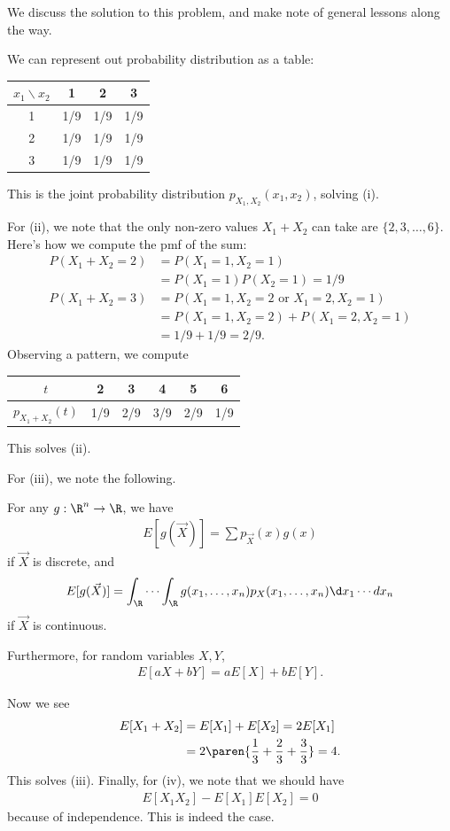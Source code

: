 \documentclass[11pt]{article}
\begin{document}
We discuss the solution to this problem, and make note of general lessons along the way.

We can represent out probability distribution as a table:
\begin{table}[H]
    \centering
    \begin{tabular}{c|ccc}
        $x_1\backslash x_2$ & 1 & 2 & 3 \\ \hline
        1 & 1/9 & 1/9 & 1/9 \\
        2 & 1/9 & 1/9 & 1/9\\
        3 & 1/9 & 1/9 & 1/9
    \end{tabular}
\end{table}
This is the joint probability distribution $p_{X_1,X_2}(x_1,x_2)$, solving (i).

For (ii), we note that the only non-zero values $X_1+X_2$ can take are $\{2,3,\dots,6\}$. Here's how we compute the pmf of the sum:
\begin{align*}
P(X_1+X_2=2) &=P(X_1=1,X_2=1) \\
&= P(X_1=1)P(X_2=1)=1/9 \\
P(X_1+X_2=3) &= P(X_1=1,X_2=2 \text{ or } X_1=2,X_2=1) \\
&= P(X_1=1,X_2=2) + P(X_1=2,X_2=1) \\
&= 1/9 + 1/9 = 2/9.
\end{align*}
Observing a pattern, we compute
\begin{table}[H]
    \centering
    \begin{tabular}{c|ccccc}
        $t$ & 2&3&4&5&6 \\ \hline
        $p_{X_1+X_2}(t)$ & 1/9 & 2/9 & 3/9 & 2/9 & 1/9
    \end{tabular}
\end{table}
This solves (ii).

For (iii), we note the following.
\begin{prop}
For any $g:\R^n \to \R$, we have
\begin{align*}
E[g(\vec X)]=\sum p_{\vec X}(x)g(x)
\end{align*}
if $\vec X$ is discrete, and
\begin{align*}
E[g(\vec X)] = \int_\R \cdots \int_\R g(x_1,\dots,x_n)p_X(x_1,\dots,x_n)\d x_1\cdots dx_n
\end{align*}
if $\vec X$ is continuous.

Furthermore, for random variables $X, Y$,
\begin{align*}
E[a X + b Y]=aE[X]+bE[Y].
\end{align*}
\end{prop}
Now we see
\begin{align*}
E[X_1+X_2]&=E[X_1]+E[X_2]=2E[X_1] \\
&= 2\paren{\frac{1}{3}+\frac{2}{3}+\frac{3}{3}}=4.
\end{align*}
This solves (iii). Finally, for (iv), we note that we should have
\begin{align*}
E[X_1X_2]-E[X_1]E[X_2]=0
\end{align*}
because of independence. This is indeed the case.
\end{document}
